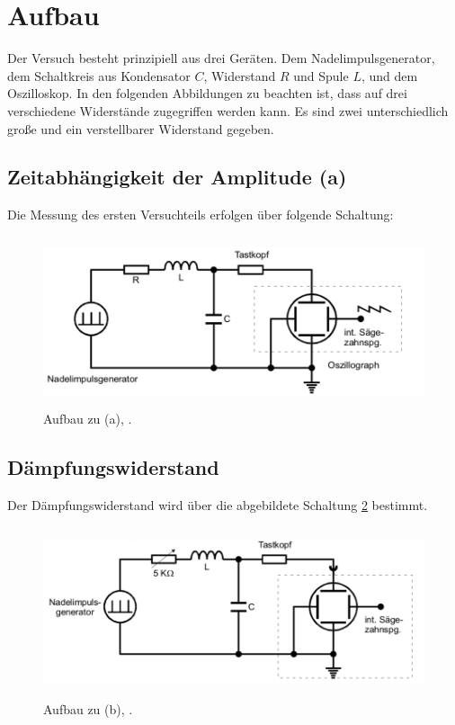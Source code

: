 \section{Aufbau}
Der Versuch besteht prinzipiell aus drei Geräten. Dem Nadelimpulsgenerator, dem Schaltkreis aus Kondensator $C$, Widerstand $R$ und Spule $L$, und dem Oszilloskop. 
In den folgenden Abbildungen zu beachten ist, dass auf drei verschiedene Widerstände zugegriffen werden kann. Es sind zwei unterschiedlich große und ein verstellbarer Widerstand gegeben. 
\subsection{Zeitabhängigkeit der Amplitude (a)}

Die Messung des ersten Versuchteils erfolgen über folgende Schaltung:
\begin{figure}[H]
  \centering
  \includegraphics[height=5cm]{Aufbau/Grafiken/a.pdf}
  \caption{Aufbau zu (a), \cite{1}.}
  \label{fig:a}
\end{figure}

\subsection{Dämpfungswiderstand}

Der Dämpfungswiderstand wird über die abgebildete Schaltung \ref{fig:b} bestimmt.
\begin{figure}[H]
  \centering
  \includegraphics[height=5cm]{Aufbau/Grafiken/b.pdf}
  \caption{Aufbau zu (b), \cite{1}.}
  \label{fig:b}
\end{figure}
\newpage
